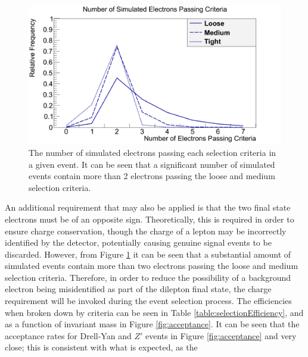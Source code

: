 \documentclass{article}
\begin{document}



\begin{figure}[h]
    \centering
    \includegraphics[scale=0.3]{images/nEl.png}
    \caption{The number of simulated electrons passing each selection criteria in a given event. It can be seen that a significant number of simulated events contain more than 2 electrons passing the loose and medium selection criteria. \label{fig:nEl}}
\end{figure}

An additional requirement that may also be applied is that the two final state electrons must be of an opposite sign. Theoretically, this is required in order to ensure charge conservation, though the charge of a lepton may be incorrectly identified by the detector, potentially causing genuine signal events to be discarded. However, from Figure \ref{fig:nEl} it can be seen that a substantial amount of simulated events contain more than two electrons passing the loose and medium selection criteria. Therefore, in order to reduce the possibility of a background electron being misidentified as part of the dilepton final state, the charge requirement will be  invoked during the event selection process. The efficiencies when broken down by criteria can be seen in Table \ref{table:selectionEfficiency}, and as a function of invariant mass in Figure \ref{fig:acceptance}. It can be seen that the acceptance rates for Drell-Yan and $Z'$ events in Figure \ref{fig:acceptance} and very close; this is consistent with what is expected, as the 
\end{document}
